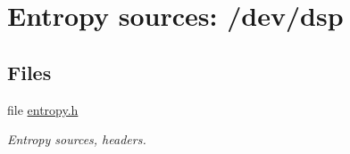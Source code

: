 \hypertarget{group__ES__dsp__m}{
\section{Entropy sources: /dev/dsp}
\label{group__ES__dsp__m}
}
\subsection*{Files}
\begin{CompactItemize}
\item 
file \hyperlink{entropy_8h}{entropy.h}
\begin{CompactList}\small\item\em Entropy sources, headers. \item\end{CompactList}

\end{CompactItemize}
